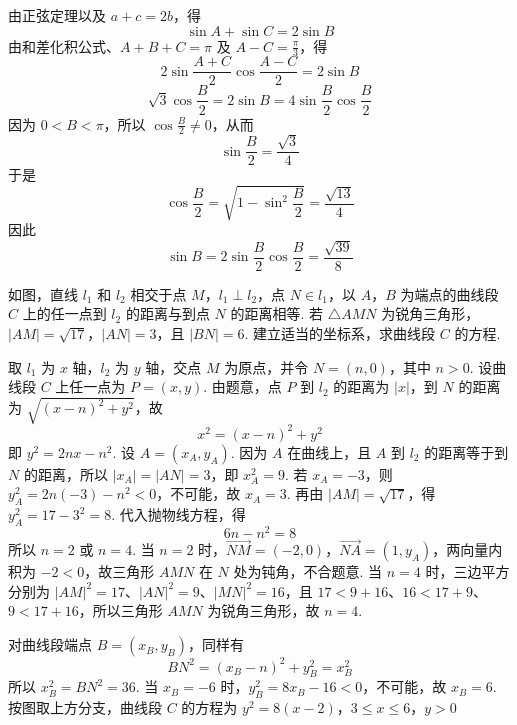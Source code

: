 \begin{solution}
由正弦定理以及 \(a+c=2b\)，得
\[
\sin A+\sin C=2\sin B
\]
由和差化积公式、\(A+B+C=\pi\) 及 \(A-C=\frac{\pi}{3}\)，得
\[
2\sin\frac{A+C}{2}\cos\frac{A-C}{2}=2\sin B
\]
\[
\sqrt{3}\cos\frac{B}{2}=2\sin B=4\sin\frac{B}{2}\cos\frac{B}{2}
\]
因为 \(0<B<\pi\)，所以 \(\cos\frac{B}{2}\ne0\)，从而
\[
\sin\frac{B}{2}=\frac{\sqrt{3}}{4}
\]
于是
\[
\cos\frac{B}{2}=\sqrt{1-\sin^{2}\frac{B}{2}}=\frac{\sqrt{13}}{4}
\]
因此
\[
\sin B=2\sin\frac{B}{2}\cos\frac{B}{2}=\frac{\sqrt{39}}{8}
\]
\end{solution}

\begin{problem}
如图，直线 \(l_{1}\) 和 \(l_{2}\) 相交于点 \(M\)，\(l_{1} \perp l_{2}\)，点 \(N \in l_{1}\)，以 \(A\)，\(B\) 为端点的曲线段 \(C\) 上的任一点到 \(l_{2}\) 的距离与到点 \(N\) 的距离相等. 若 \(\triangle AMN\) 为锐角三角形，\(|AM| = \sqrt{17}\)，\(|AN| = 3\)，且 \(|BN| = 6\). 建立适当的坐标系，求曲线段 \(C\) 的方程.

\end{problem}

\begin{solution}
取 \(l_{1}\) 为 \(x\) 轴，\(l_{2}\) 为 \(y\) 轴，交点 \(M\) 为原点，并令 \(N=(n,0)\)，其中 \(n>0\). 设曲线段 \(C\) 上任一点为 \(P=(x,y)\). 由题意，点 \(P\) 到 \(l_{2}\) 的距离为 \(\lvert x\rvert\)，到 \(N\) 的距离为 \(\sqrt{(x-n)^{2}+y^{2}}\)，故
\[
x^{2}=(x-n)^{2}+y^{2}
\]
即 \(y^{2}=2nx-n^{2}\).
设 \(A=(x_{A},y_{A})\). 因为 \(A\) 在曲线上，且 \(A\) 到 \(l_{2}\) 的距离等于到 \(N\) 的距离，所以 \(\lvert x_{A}\rvert=\lvert AN\rvert=3\)，即 \(x_{A}^{2}=9\). 若 \(x_{A}=-3\)，则 \(y_{A}^{2}=2n(-3)-n^{2}<0\)，不可能，故 \(x_{A}=3\). 再由 \(\lvert AM\rvert=\sqrt{17}\)，得 \(y_{A}^{2}=17-3^{2}=8\). 代入抛物线方程，得
\[
6n-n^{2}=8
\]
所以 \(n=2\) 或 \(n=4\). 当 \(n=2\) 时，\(\overrightarrow{NM}=(-2,0)\)，\(\overrightarrow{NA}=(1,y_{A})\)，两向量内积为 \(-2<0\)，故三角形 \(AMN\) 在 \(N\) 处为钝角，不合题意. 当 \(n=4\) 时，三边平方分别为
\(|AM|^{2}=17\)、\(|AN|^{2}=9\)、\(|MN|^{2}=16\)，且 \(17<9+16\)、\(16<17+9\)、\(9<17+16\)，所以三角形 \(AMN\) 为锐角三角形，故 \(n=4\).

对曲线段端点 \(B=(x_{B},y_{B})\)，同样有
\[
BN^{2}=(x_{B}-n)^{2}+y_{B}^{2}=x_{B}^{2}
\]
所以 \(x_{B}^{2}=BN^{2}=36\). 当 \(x_{B}=-6\) 时，\(y_{B}^{2}=8x_{B}-16<0\)，不可能，故 \(x_{B}=6\). 按图取上方分支，曲线段 \(C\) 的方程为
\(y^{2}=8(x-2)\)，\(3\leq x\leq6\)，\(y>0\)
\end{solution}


